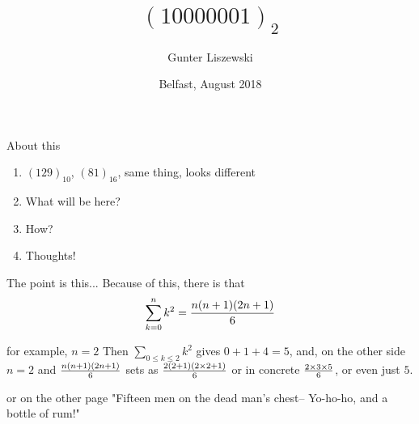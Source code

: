 \documentclass[pdf]{beamer}
\title{$(10000001)_2$}
\author{Gunter Liszewski}
\date{Belfast, August 2018}
\begin{document}
\begin{frame}
  \titlepage
\end{frame}


\begin{frame}{About this}

  \begin{enumerate}[A]
    First
    second
    third
    ..., 
    last

    \pause
    \item $(129)_{10}$, $(81)_{16}$, same thing, looks different
    \pause
    \item What will be here?
    \pause
    \item How?
    \pause
    \item Thoughts!
  \end{enumerate}
\end{frame}

\begin{frame}{The point is this...}
  Because of this, there is that
$$\sum_{k=0}^{n}{k^2}={n(n+1)(2n+1)\over 6}$$
\end{frame}


\begin{frame}{for example, $n=2$}
  Then $\sum_{0\le k\le2}k^2$ gives $0+1+4=5$, and, on the other side $n=2$ and ${n(n+1)(2n+1)\over 6}$
sets as ${2(2+1)(2\times2+1)\over 6}$ or in concrete $2\times3\times5\over6$, or even just $5$.
\end{frame}

\begin{frame}{or on the other page}
  "Fifteen men on the dead man's chest--
             Yo-ho-ho, and a bottle of rum!"
\end{frame}
\end{document}
